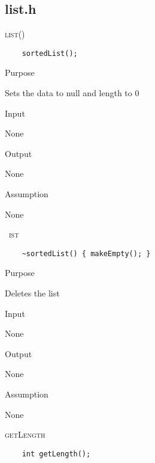 \documentclass[pdftex, 11pt]{article}
\begin{document}
\subsection{list.h}

\begin{description}

	\item{\textsc{list()}}
\begin{lstlisting}
	sortedList();
\end{lstlisting}

		\begin{description}

			\item{Purpose}

				Sets the data to null and length to 0

			\item{Input}

				None

			\item{Output}

				None

			\item{Assumption}

				None

		\end{description}

	\item{\textsc{~ist}}
\begin{lstlisting}
	~sortedList() { makeEmpty(); }
\end{lstlisting}

		\begin{description}

			\item{Purpose}

				Deletes the list

			\item{Input}

				None

			\item{Output}

				None

			\item{Assumption}

				None

		\end{description}

	\item{\textsc{getLength}}
\begin{lstlisting}
	int getLength();
\end{lstlisting}


\end{description}
\end{document}
